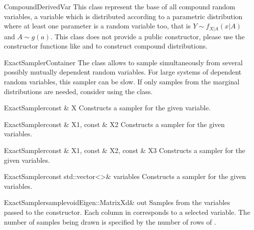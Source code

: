 \documentclass[a4paper, 10pt]{paper}
\begin{document}
\begin{defclassex}{Compound}{DerivedVar}
This class represent the base of all compound random variables, a variable which is distributed according to a parametric distribution
where at least one parameter is a random variable too, that is $Y\sim f_{X|A}(x|A)$ and $A\sim g(a)$. This class does not provide 
a public constructor, please use the constructor functions like  and  to construct 
compound distributions.
\end{defclassex}

\begin{defclassex}{ExactSampler}{Container}
The  class allows to sample simultaneously from several possibly mutually dependent random variables. For large 
systems of dependent random variables, this sampler can be slow. If only samples from the marginal distributions are needed, consider
using the  class.

\begin{classsyn}{ExactSampler}{const \& X}
Constructs a sampler for the given variable.
\end{classsyn}

\begin{classsyn}{ExactSampler}{const \& X1, const \& X2}
Constructs a sampler for the given variables.
\end{classsyn}

\begin{classsyn}{ExactSampler}{const \& X1, const \& X2, const \& X3}
Constructs a sampler for the given variables.
\end{classsyn}

\begin{classsyn}{ExactSampler}{const std::vector<>\& variables}
Constructs a sampler for the given variables.
\end{classsyn}

\begin{defmeth}{ExactSampler}{sample}{void}{Eigen::MatrixXd\& out}
Samples from the variables passed to the constructor. Each column in  corresponds to a 
selected variable. The number of samples being drawn is specified by the number of rows of .
\end{defmeth}
\end{defclassex}
\end{document}
